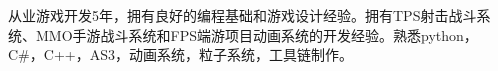 


\cvself
{从业游戏开发5年，拥有良好的编程基础和游戏设计经验。拥有TPS射击战斗系统、MMO手游战斗系统和FPS端游项目动画系统的开发经验。熟悉python，C\#，C++，AS3，动画系统，粒子系统，工具链制作。}

